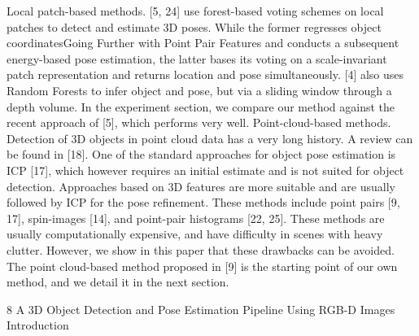 \documentclass[10]{article}
\begin{document}
Local patch-based methods. [5, 24] use forest-based voting schemes on local patches to detect and estimate 3D poses. While the former regresses object coordinatesGoing Further with Point Pair Features and conducts a subsequent energy-based pose estimation, the latter bases its voting on a scale-invariant patch representation and returns location and pose simultaneously. [4] also uses Random Forests to infer object and pose, but via a sliding window through a depth volume. In the experiment section, we compare our method against the recent approach of [5], which performs very well.
Point-cloud-based methods. Detection of 3D objects in point cloud data has a very long history. A review can be found in [18]. One of the standard approaches for object pose estimation is ICP [17], which however requires an initial estimate and is not suited for object detection. Approaches based on 3D features are more suitable and are usually followed by ICP for the pose refinement. These methods include point pairs [9, 17], spin-images [14], and point-pair histograms [22, 25].
These methods are usually computationally expensive, and have difficulty in scenes with heavy clutter. However, we show in this paper that these drawbacks can be avoided. The point cloud-based method proposed in [9] is the starting point of our own method, and we detail it in the next section.



8 A 3D Object Detection and Pose Estimation Pipeline Using RGB-D Images\\

Introduction \\
\end{document}
